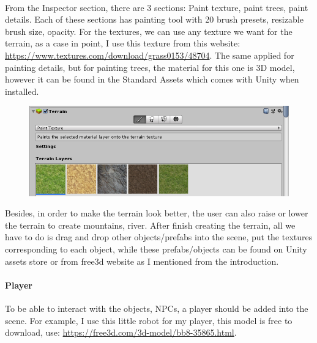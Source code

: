 \documentclass[a4paper, 13pt]{extarticle}
\begin{document}
 	  \\[0.15cm]
 	  From the Inspector section, there are 3 sections: Paint texture, paint trees, paint details. Each of these sections has painting tool with 20 brush presets, resizable brush size, opacity. For the textures, we can use any texture we want for the terrain, as a case in point, I use this texture from this website: \href{https://www.textures.com/download/grass0153/48704}{https://www.textures.com/download/grass0153/48704}. The same applied for painting details, but for painting trees, the material for this one is 3D model, however it can be found in the Standard Assets which comes with Unity when installed. 
 	   \begin{figure}[h]
 	   	 \centering
 	   	 \begin{minipage}{1\textwidth}
 	   	 	\centering
 	   	 	\includegraphics[width=0.75\linewidth]{intructions/3.png}
 	   	 	\label{fig:test4}
 	   	 \end{minipage}
 		 \end{figure}  
 		 
 	Besides, in order to make the terrain look better, the user can also raise or lower the terrain to create mountains, river. After finish creating the terrain, all we have to do is drag and drop other objects/prefabs into the scene, put the textures corresponding to each object, while these prefabs/objects can be found on Unity assets store or from free3d website as I mentioned from the introduction. 
 	 \paragraph{Player}
 	 To be able to interact with the objects, NPCs, a player should be added into the scene. For example, I use this little robot for my player, this model is free to download, use: \href{https://free3d.com/3d-model/bb8-35865.html}{https://free3d.com/3d-model/bb8-35865.html}.
 	 
\end{document}
